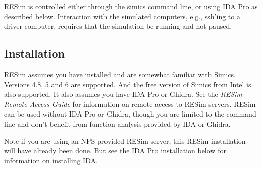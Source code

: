 \documentclass[titlepage]{article}
\begin{document}
RESim is controlled either through the simics command line, or using IDA Pro as described below.  Interaction with the simulated
computers, e.g., ssh'ing to a driver computer, requires that the simulation be running and not paused.

\subsection{Installation}
\label{installation}
RESim assumes you have installed and are somewhat familiar with Simics.  Versions 4.8, 5 and 6 are supported.
And the free version of Simics from Intel is also supported.
It also assumes you have IDA Pro or Ghidra. See the \textit{RESim Remote Access Guide} for information on remote access to RESim
servers.  RESim can be used without IDA Pro or Ghidra, though you are limited to the command line and don't benefit from
function analysis provided by IDA or Ghidra.

Note if you are using an NPS-provided RESim server, this RESim installation will have already been done.  But
see the IDA Pro installation below for information on installing IDA. 
\end{document}
